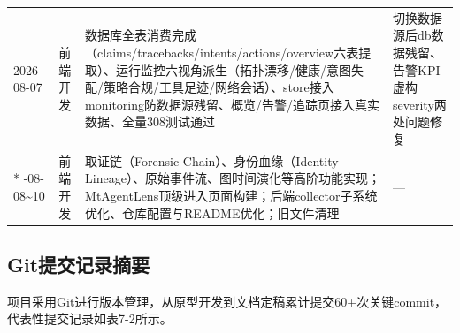 \documentclass[a4paper]{ctexart}
\makeatletter
\renewcommand{\_}{%
  \ifmmode
    \nfss@text{\textunderscore}%
  \else
    \textunderscore\discretionary{}{}{}%
  \fi}
\makeatother
\begin{document}
{\begin{longtable}{@{} p{4.2cm} p{1.8cm} p{5cm} p{4.2cm} @{}}
\hline
2026-08-07 & 前端开发 & 数据库全表消费完成（claims/tracebacks/intents/actions/overview六表提取）、运行监控六视角派生（拓扑漂移/健康/意图失配/策略合规/工具足迹/网络会话）、store接入monitoring防数据源残留、概览/告警/追踪页接入真实数据、全量308测试通过 & 切换数据源后db数据残留、告警KPI虚构severity两处问题修复 \\*
\hline
2026-08-08\textasciitilde{}10 & 前端开发 & 取证链（Forensic Chain）、身份血缘（Identity Lineage）、原始事件流、图时间演化等高阶功能实现；MtAgentLens顶级进入页面构建；后端collector子系统优化、仓库配置与README优化；旧文件清理 & — \\
\hline
\end{longtable}
\par}


\subsection{Git提交记录摘要}



项目采用Git进行版本管理，从原型开发到文档定稿累计提交60+次关键commit，代表性提交记录如表7-2所示。
\end{document}
